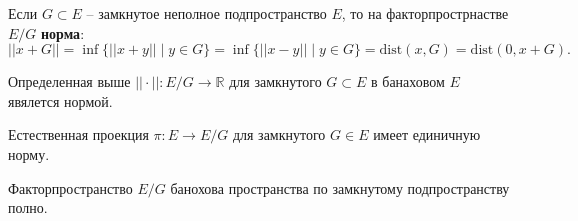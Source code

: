 \begin{to_def}
	Если $G \subset E$ -- замкнутое неполное подпространство $E$, то на факторпрострнастве $E/G$ \textbf{норма}:
	\begin{equation*}
		||x+G|| = \inf \{||x+y|| \mid y \in G\} = \inf \{||x-y|| \mid y \in G\} = \text{dist}(x,G) = \text{dist}(0,x+G).
	\end{equation*}
\end{to_def}
\begin{to_lem}
	Определенная выше $||\cdot|| \colon E/G \to \mathbb{R}$ для замкнутого $G \subset E$ в банаховом $E$ явялется нормой.
\end{to_lem}

\begin{to_lem}
	Естественная проекция $\pi \colon E \to E/G$ для замкнутого $G \in E$ имеет единичную норму.
\end{to_lem}

\begin{to_lem}
	Факторпространство $E/G$ банохова пространства по замкнутому подпространству полно.
\end{to_lem}